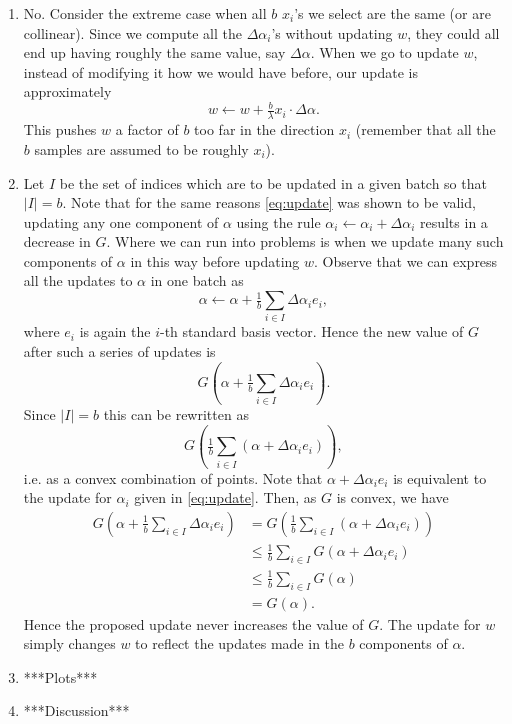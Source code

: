 \documentclass{article}
\begin{document}
\begin{enumerate}
	\item No. Consider the extreme case when all $b$ $x_i$'s we select are the same (or are collinear). Since we compute all the $\Delta\alpha_i$'s without updating $w$, they could all end up having roughly the same value, say $\Delta \alpha$. When we go to update $w$, instead of modifying it how we would have before, our update is approximately
	\begin{equation}
		w\leftarrow w + \tfrac{b}{\lambda}x_i\cdot\Delta\alpha.
	\end{equation}
	This pushes $w$ a factor of $b$ too far in the direction $x_i$ (remember that all the $b$ samples are assumed to be roughly $x_i$).
	\item Let $I$ be the set of indices which are to be updated in a given batch so that $|I|=b$. Note that for the same reasons \eqref{eq:update} was shown to be valid, updating any one component of $\alpha$ using the rule $\alpha_i\leftarrow \alpha_i+\Delta\alpha_i$ results in a decrease in $G$. Where we can run into problems is when we update many such components of $\alpha$ in this way before updating $w$. Observe that we can express all the updates to $\alpha$ in one batch as
	\begin{equation}
		\alpha\leftarrow \alpha+\tfrac1b\sum_{i\in I}\Delta\alpha_ie_i,
	\end{equation}
	where $e_i$ is again the $i$-th standard basis vector. Hence the new value of $G$ after such a series of updates is
	\begin{equation}
		G\left(\alpha+\tfrac1b\sum_{i\in I}\Delta\alpha_ie_i\right).
	\end{equation}
	Since $|I|=b$ this can be rewritten as
	\begin{equation}
		G\left(\tfrac1b\sum_{i\in I}\left(\alpha+\Delta\alpha_ie_i\right)\right),
	\end{equation}
	i.e. as a convex combination of points. Note that $\alpha+\Delta\alpha_ie_i$ is equivalent to the update for $\alpha_i$ given in \eqref{eq:update}. Then, as $G$ is convex, we have
	\begin{align}
		G\left(\alpha+\tfrac1b\sum_{i\in I}\Delta\alpha_ie_i\right) &=G\left(\tfrac1b\sum_{i\in I}\left(\alpha+\Delta\alpha_ie_i\right)\right)\\
		&\leq \tfrac1b\sum_{i\in I}G(\alpha+\Delta\alpha_ie_i)\\
		&\leq \tfrac1b\sum_{i\in I}G(\alpha)\\
		&=G(\alpha).
	\end{align}
	Hence the proposed update never increases the value of $G$. The update for $w$ simply changes $w$ to reflect the updates made in the $b$ components of $\alpha$.

	\item ***Plots***

	\item ***Discussion***
\end{enumerate}
\end{document}
